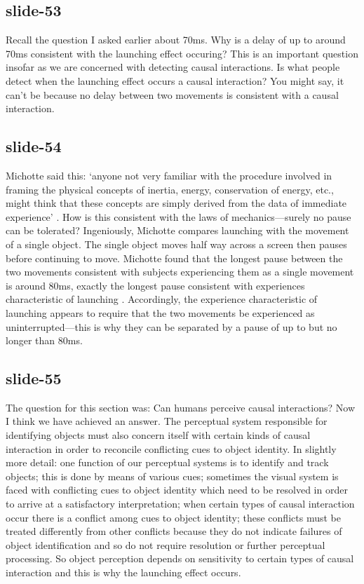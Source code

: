 \documentclass[12pt,\papersize]{extarticle}
\begin{document}
 
\subsection{slide-53}
Recall the question I asked earlier about 70ms.
Why is a delay of up to around 70ms consistent with the launching effect occuring?
This is an important question insofar as we are concerned with detecting causal interactions. Is what people detect when the launching effect occurs a causal interaction? You might say, it can't be because no delay between two movements is consistent with a causal interaction.
 
 
\subsection{slide-54}
Michotte said this:
‘anyone not very familiar with the procedure involved in framing the physical concepts of inertia, energy, conservation of energy, etc., might think that these concepts are simply derived from the data of immediate experience’ \citep[p.\ 223]{Michotte:1946nz}. 
How is this consistent with the laws of mechanics—surely no pause can be tolerated? Ingeniously, Michotte compares launching with the movement of a single object. The single object moves half way across a screen then pauses before continuing to move. Michotte found that the longest pause between the two movements consistent with subjects experiencing them as a single movement is around 80ms, exactly the longest pause consistent with experiences characteristic of launching \citep[pp.\ 91--8, 124]{Michotte:1946nz}. Accordingly, the experience characteristic of launching appears to require that the two movements be experienced as uninterrupted—this is why they can be separated by a pause of up to but no longer than 80ms.
 
 
\subsection{slide-55}
The question for this section was:
Can humans perceive causal interactions?
Now I think we have achieved an answer.
The perceptual system responsible for identifying objects must also concern itself with certain kinds of causal interaction in order to reconcile conflicting cues to object identity.
In slightly more detail: one function of our perceptual systems is to identify and track objects; this is done by means of various cues; sometimes the visual system is faced with conflicting cues to object identity which need to be resolved in order to arrive at a satisfactory interpretation; when certain types of causal interaction occur there is a conflict among cues to object identity; these conflicts must be treated differently from other conflicts because they do not indicate failures of object identification and so do not require resolution or further perceptual processing. So object perception depends on sensitivity to certain types of causal interaction and this is why the launching effect occurs.
 
\end{document}

